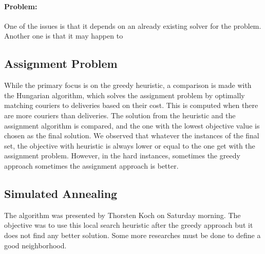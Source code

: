 \documentclass[a4paper]{article}
\begin{document}
\paragraph{Problem:} One of the issues is that it depends on an already existing solver for the problem.
Another one is that it may happen to 

\subsection{Assignment Problem}
While the primary focus is on the greedy heuristic, a comparison is made with the Hungarian algorithm, which solves the assignment problem by optimally matching couriers to deliveries based on their cost. This is computed when there are more couriers than deliveries. The solution from the heuristic and the assignment algorithm is compared, and the one with the lowest objective value is chosen as the final solution. We observed that whatever the instances of the final set, the objective with heuristic is always lower or equal to the one get with the assignment problem. However, in the hard instances, sometimes the greedy approach sometimes the assignment approach is better.

\subsection{Simulated Annealing}
The algorithm was presented by Thorsten Koch on Saturday morning. The objective was to use this local search heuristic after the greedy approach but it does not find any better solution. Some more researches must be done to define a good neighborhood.
\end{document}
